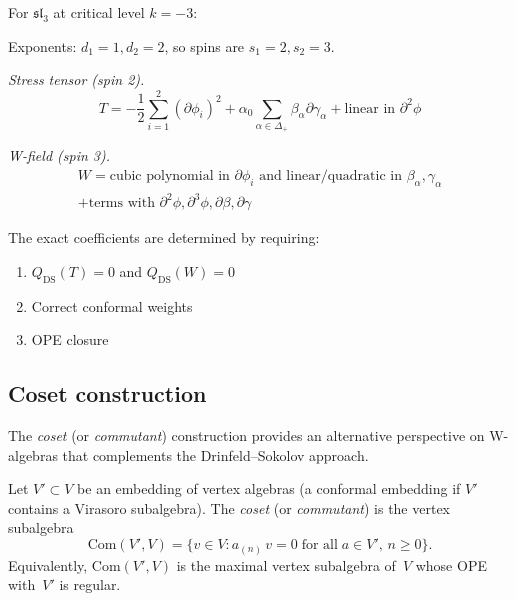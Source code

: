 \begin{example}
For $\mathfrak{sl}_3$ at critical level $k = -3$:

Exponents: $d_1 = 1, d_2 = 2$, so spins are $s_1 = 2, s_2 = 3$.

\emph{Stress tensor (spin 2).}
\begin{equation}
T = -\frac{1}{2} \sum_{i=1}^2 (\partial \phi_i)^2 + \alpha_0 \sum_{\alpha \in \Delta_+} \beta_\alpha \partial \gamma_\alpha + \text{linear in } \partial^2\phi
\end{equation}

\emph{W-field (spin 3).}
\begin{multline}
W = \text{cubic polynomial in } \partial\phi_i \text{ and linear/quadratic in } \beta_\alpha, \gamma_\alpha \\
+ \text{terms with } \partial^2\phi, \partial^3\phi, \partial\beta, \partial\gamma
\end{multline}

The exact coefficients are determined by requiring:
\begin{enumerate}
\item $Q_{\text{DS}}(T) = 0$ and $Q_{\text{DS}}(W) = 0$
\item Correct conformal weights
\item OPE closure
\end{enumerate}
\end{example}

\subsection{Coset construction}\label{sec:coset-construction}

The \emph{coset} (or \emph{commutant}) construction provides an
alternative perspective on W-algebras that complements the
Drinfeld--Sokolov approach.

\begin{definition}\label{def:coset}
Let $V' \subset V$ be an embedding of vertex algebras (a
conformal embedding if $V'$ contains a Virasoro subalgebra).
The \emph{coset} (or \emph{commutant}) is the vertex subalgebra
\begin{equation}\label{eq:coset-def}
\mathrm{Com}(V', V) = \{v \in V : a_{(n)}\, v = 0 \;\text{for
all}\; a \in V',\, n \geq 0\}.
\end{equation}
Equivalently, $\mathrm{Com}(V', V)$ is the maximal vertex
subalgebra of~$V$ whose OPE with~$V'$ is regular.
\end{definition}


